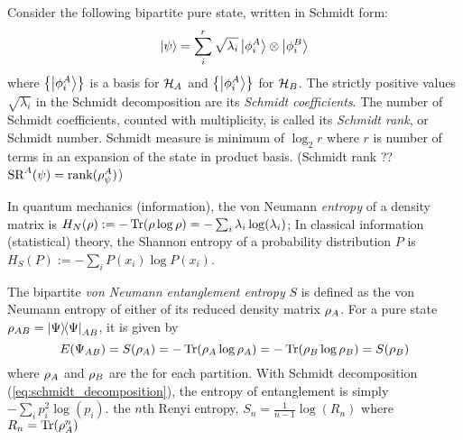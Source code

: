 \begin{definition}\label{def:schmidt_measure}
	Consider the following bipartite pure state, written in Schmidt form:
	\begin{equation}
		\ket{\psi} = \sum_i^r \sqrt{\lambda_i} \ket{\phi_i^A}\otimes\ket{\phi_i^B}
		\label{eq:schmidt_decomposition}
	\end{equation}
	where $\qty{\ket{\phi_i^A}}$ is a basis for $\mathcal{H}_A$ and $\qty{\ket{\phi_i^A}}$ for $\mathcal{H}_B$.
	The strictly positive values $\sqrt{\lambda_i}$ in the Schmidt decomposition are its \emph{Schmidt coefficients}. 
	The number of Schmidt coefficients, counted with multiplicity, is called its \emph{Schmidt rank}, or Schmidt number. 
	Schmidt measure is minimum of $\log_2 r$ where $r$ is number of terms in an expansion of the state in product basis.
	(Schmidt rank ?? $\text{SR}^A(\psi)=\rank(\rho_{\psi}^A)$)
\end{definition}
\begin{definition}[entropy]\label{def:entropy}
	In quantum mechanics (information), the von Neumann \emph{entropy} of a density matrix is $H_N(\rho): = -\Tr(\rho \log \rho)=-\sum_i\lambda_i\log(\lambda_i)$;
	In classical information (statistical) theory, the Shannon entropy of a probability distribution $P$ is  $H_S(P):= -\sum_i P(x_i) \log P(x_i)$.
\end{definition}
\begin{definition}\label{def:entanglement_entropy}
	The bipartite \emph{von Neumann entanglement entropy} $S$
	is defined as the von Neumann entropy of either of
	its reduced density matrix $\rho_A$.
	For a pure state $\rho_{AB}=\op{\Psi}{\Psi}_{AB}$,
	it is given by
	\begin{equation}
		E(\Psi_{AB}) 
		= S(\rho_A)
		= -\Tr(\rho_A \log \rho_A)
		= -\Tr(\rho_B \log \rho_B)
		= S(\rho_B)
	\end{equation}
	where $\rho_A$ and $\rho_B $ 
	are the  for each partition.
	With Schmidt decomposition (\cref{eq:schmidt_decomposition}), the entropy of entanglement is simply $-\sum_ip_i^2\log(p_i)$.
	the $n$th Renyi entropy,
	$S_n = \frac{1}{n-1} \log (R_n)$
	where $R_n = \Tr(\rho^n_A)$
\end{definition}
